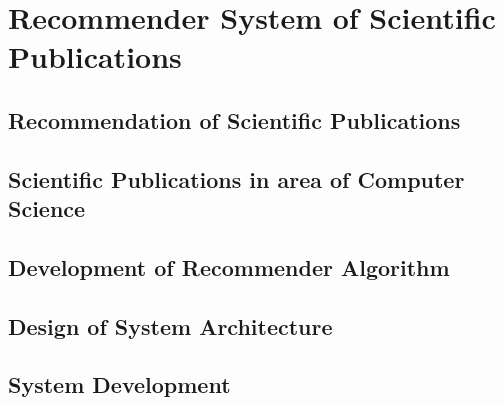 \chapter{Recommender System of Scientific Publications}


\section{Recommendation of Scientific Publications}
\subsection{}
\subsection{}

\section{Scientific Publications in area of Computer Science}
\subsection{}
\subsection{}

\section{Development of Recommender Algorithm}
\subsection{}
\subsection{}

\section{Design of System Architecture}
\subsection{}
\subsection{}

\section{System Development}
\subsection{}
\subsection{}
